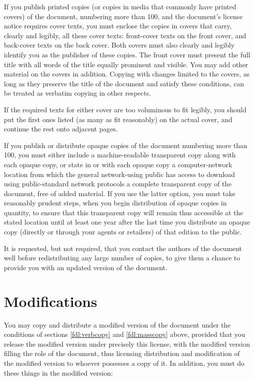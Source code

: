 \begin{multicols}{3}
If you publish printed copies (or copies in media that commonly have printed covers) of the document, numbering more than 100, and the document's license notice requires cover texts, you must enclose the copies in covers that carry, clearly and legibly, all these cover texts: front-cover texts on the front cover, and back-cover texts on the back cover. Both covers must also clearly and legibly identify you as the publisher of these copies. The front cover must present the full title with all words of the title equally prominent and visible. You may add other material on the covers in addition. Copying with changes limited to the covers, as long as they preserve the title of the document and satisfy these conditions, can be treated as verbatim copying in other respects.

If the required texts for either cover are too voluminous to fit legibly, you should put the first ones listed (as many as fit reasonably) on the actual cover, and continue the rest onto adjacent pages.

If you publish or distribute opaque copies of the document numbering more than 100, you must either include a machine-readable transparent copy along with each opaque copy, or state in or with each opaque copy a computer-network location from which the general network-using public has access to download using public-standard network protocols a complete transparent copy of the document, free of added material. If you use the latter option, you must take reasonably prudent steps, when you begin distribution of opaque copies in quantity, to ensure that this transparent copy will remain thus accessible at the stated location until at least one year after the last time you distribute an opaque copy (directly or through your agents or retailers) of that edition to the public.

It is requested, but not required, that you contact the authors of the document well before redistributing any large number of copies, to give them a chance to provide you with an updated version of the document.

\section{Modifications}
\label{fdl:mods}

You may copy and distribute a modified version of the document under the conditions of sections \ref{fdl:verbcopy} and \ref{fdl:masscopy} above, provided that you release the modified version under precisely this license, with the modified version filling the role of the document, thus licensing distribution and modification of the modified version to whoever possesses a copy of it. In addition, you must do these things in the modified version:


\end{multicols}
